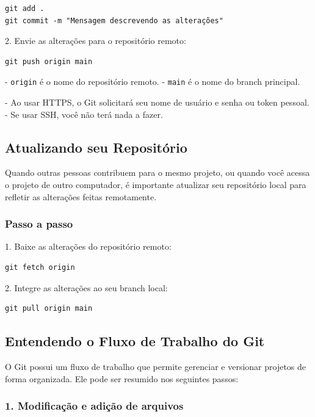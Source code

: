 \begin{lstlisting}[style=shellstyle]
git add .
git commit -m "Mensagem descrevendo as alterações"
\end{lstlisting}

2. Envie as alterações para o repositório remoto:

\begin{lstlisting}[style=shellstyle]
git push origin main
\end{lstlisting}

\noindent
- \texttt{origin} é o nome do repositório remoto.  
- \texttt{main} é o nome do branch principal.  

- Ao usar HTTPS, o Git solicitará seu nome de usuário e senha ou token pessoal.
- Se usar SSH, você não terá nada a fazer.

\subsection{Atualizando seu Repositório}

Quando outras pessoas contribuem para o mesmo projeto, ou quando você acessa o projeto de outro computador, é importante atualizar seu repositório local para refletir as alterações feitas remotamente.

\subsubsection*{Passo a passo}

1. Baixe as alterações do repositório remoto:

\begin{lstlisting}[style=shellstyle]
git fetch origin
\end{lstlisting}

2. Integre as alterações ao seu branch local:

\begin{lstlisting}[style=shellstyle]
git pull origin main
\end{lstlisting}


\subsection{Entendendo o Fluxo de Trabalho do Git}

O Git possui um fluxo de trabalho que permite gerenciar e versionar projetos de forma organizada. Ele pode ser resumido nos seguintes passos:

\subsubsection*{1. Modificação e adição de arquivos}

